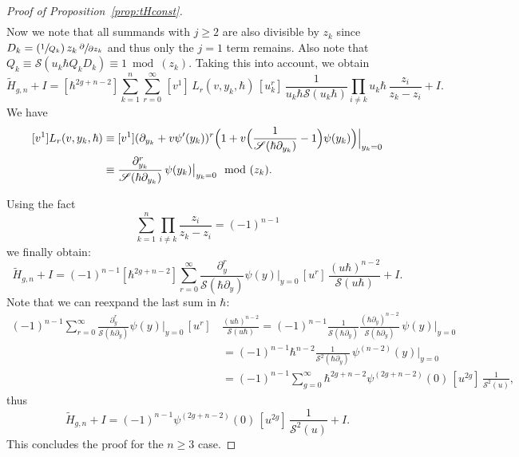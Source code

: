 \documentclass[11pt]{article}
\let\mathcal\mathscr
\newcommand{\Psfrac}[2]{(\sfrac{#1}{#2})}
\theoremstyle{plain}
\theoremstyle{definition}
\theoremstyle{remark}
\newcommand{\cS}{\mathcal{S}}
\begin{document}
\begin{proof}[Proof of Proposition~\ref{prop:tHconst}]
\begin{multline}
\end{multline}
Now we note that all summands with $j\geq 2$ are also divisible by $z_k$ since $D_k=\Psfrac{1}{Q_k}\,z_k\,\sfrac{\partial}{\partial z_k}$ and thus only the $j=1$ term remains.
Also note that $Q_k\equiv \cS(u_k\hbar Q_kD_k)\equiv 1\bmod {(z_k)}$. Taking this into account, we obtain
\begin{equation*}
\widetilde{H}_{g,n}+I = [\hbar^{2g+n-2}]\sum\limits_{k=1}^n\sum\limits_{r=0}^\infty \,[v^1]\,L_r(v,y_k,\hbar)\,[u_k^r]\, \frac{1}{u_k\hbar \cS(u_k\hbar)}\prod\limits_{i\neq k}u_k\hbar\,\frac{z_i}{z_k-z_i} + I.
\end{equation*}
We have
\begin{equation}\label{eq:L1expr}
\begin{aligned}
{}[v^1]L_r(v,y_k,\hbar)&\equiv[v^1](\partial_{y_k}+v\psi'(y_k))^r \Bigl(1+v \Bigl(\frac1{\cS(\hbar\partial_{y_k})}-1 \Bigr)\psi(y_k) \Bigr)\Big|_{y_k=0} \\
&\equiv\frac{\partial_{y_k}^r}{\cS(\hbar \partial_{y_k})}\,\psi(y_k)\big|_{y_k=0} \mod{(z_k)}.
\end{aligned}
\end{equation}

Using the fact
\begin{equation*}
\sum\limits_{k=1}^n\prod\limits_{i\neq k} \frac{z_i}{z_k-z_i}=(-1)^{n-1}
\end{equation*}
we finally obtain:\vspace*{-5pt}
\begin{equation*}
\widetilde{H}_{g,n}+I=(-1)^{n-1}[\hbar^{2g+n-2}]\sum\limits_{r=0}^\infty \frac{\partial_{y}^r}{\cS(\hbar \partial_y)}\psi(y)\big|_{y=0} \,[u^r]\,\frac{(u\hbar)^{n-2}}{\cS(u\hbar)} + I.
\end{equation*}
Note that we can reexpand the last sum in $\hbar$:\vspace*{-5pt}
\begin{align*}\label{eq:psidertr}
(-1)^{n-1}\sum\limits_{r=0}^\infty \frac{\partial_{y}^r}{\cS(\hbar \partial_y)}\psi(y)\big|_{y=0} \,[u^r]\,&\frac{(u\hbar)^{n-2}}{\cS(u\hbar)}=(-1)^{n-1}\frac1{\cS(\hbar \partial_y)}\frac{(\hbar\partial_y)^{n-2}}{\cS(\hbar \partial_y)}\,\psi(y)\Big|_{y=0} \\
& = (-1)^{n-1}\hbar^{n-2}\frac1{\cS^2(\hbar \partial_y)}\,\psi^{(n-2)}(y)\Big|_{y=0}\\
& =(-1)^{n-1}\sum_{g=0}^\infty\hbar^{2g+n-2}\psi^{(2g+n-2)}(0)\,[u^{2g}]\,\frac1{\cS^2(u)},
\end{align*}
thus\vspace*{-5pt}
\begin{equation}\label{eq:Htildeansw}
\widetilde{H}_{g,n}+I=(-1)^{n-1}\psi^{(2g+n-2)}(0)\,[u^{2g}]\,\frac1{\cS^2(u)} + I.
\end{equation}
This concludes the proof for the $n\geq 3$ case.


\end{proof}
\end{document}
